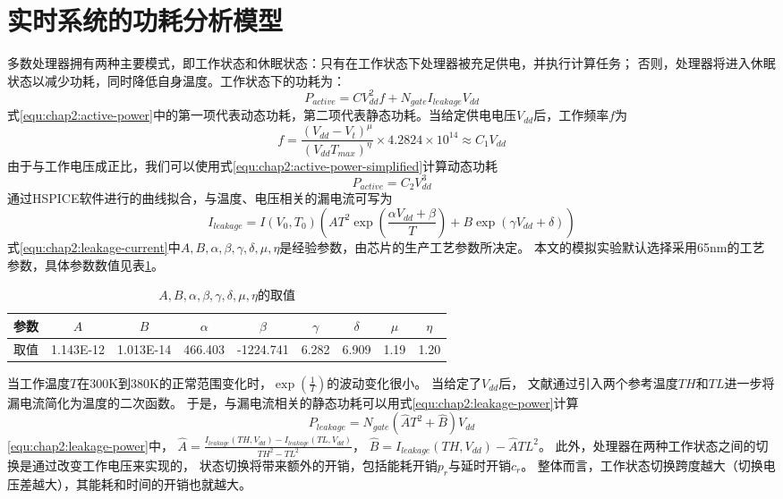 \section{实时系统的功耗分析模型}
\label{sec:power}
多数处理器拥有两种主要模式，即工作状态和休眠状态：只有在工作状态下处理器被充足供电，并执行计算任务； 否则，处理器将进入休眠状态以减少功耗，同时降低自身温度。工作状态下的功耗为：
\begin{equation}
\label{equ:chap2:active-power}
P_{active} = CV_{dd}^2f+N_{gate}I_{leakage}V_{dd}
\end{equation}
式\ref{equ:chap2:active-power}中的第一项代表动态功耗，第二项代表静态功耗。当给定供电电压$V_{dd}$后，工作频率$f$为
\begin{equation}
\label{equ:chap2:freq}
f = \frac{(V_{dd}-V_t)^\mu}{(V_{dd}T_{max})^\eta}\times 4.2824\times 10^{14} \approx C_1V_{dd}
\end{equation}
由于与工作电压成正比，我们可以使用式\ref{equ:chap2:active-power-simplified}计算动态功耗
\begin{equation}
\label{equ:chap2:active-power-simplified}
P_{active} = C_2V_{dd}^3
\end{equation}
通过HSPICE软件进行的曲线拟合，与温度、电压相关的漏电流可写为
\begin{equation}
\label{equ:chap2:leakage-current}
I_{leakage} = I(V_0,T_0)(AT^2\exp(\frac{\alpha V_{dd}+\beta}{T})+B\exp(\gamma V_{dd}+\delta))
\end{equation}
式\ref{equ:chap2:leakage-current}中$A,B,\alpha,\beta,\gamma,\delta,\mu,\eta$是经验参数，由芯片的生产工艺参数所决定。 本文的模拟实验默认选择采用65nm的工艺参数，具体参数数值见表\ref{tab:chap2:tech-parameters}。
\begin{table}
\caption{$A,B,\alpha,\beta,\gamma,\delta,\mu,\eta$的取值}
\centering
\begin{tabular}{c c c c c c c c c}
\hline\hline
参数 & $A$ & $B$ & $\alpha$ & $\beta$ & $\gamma$ & $\delta$ & $\mu$ & $\eta$ \\
\hline
取值 & 1.143E-12 & 1.013E-14 & 466.403 & -1224.741 & 6.282 & 6.909 & 1.19 & 1.20 \\
\hline
\end{tabular}
\label{tab:chap2:tech-parameters}
\end{table}

当工作温度$T$在300K到380K的正常范围变化时，$\exp(\frac{1}{T})$的波动变化很小。 当给定了$V_{dd}$后， 文献通过引入两个参考温度$TH$和$TL$进一步将漏电流简化为温度的二次函数。 于是，与漏电流相关的静态功耗可以用式\ref{equ:chap2:leakage-power}计算
\begin{equation}
\label{equ:chap2:leakage-power}
P_{leakage} = N_{gate}(\hat{A}T^2+\hat{B})V_{dd}
\end{equation}
\ref{equ:chap2:leakage-power}中，
$\hat{A}=\frac{I_{leakage}(TH,V_{dd})-I_{leakage}(TL,V_{dd})}{{TH}^2-{TL}^2}$，
$\hat{B}=I_{leakage}(TH,V_{dd})-\hat{A}{TL}^2$。
此外，处理器在两种工作状态之间的切换是通过改变工作电压来实现的， 状态切换将带来额外的开销，包括能耗开销$p_r$与延时开销$c_r$。 整体而言，工作状态切换跨度越大（切换电压差越大），其能耗和时间的开销也就越大。

